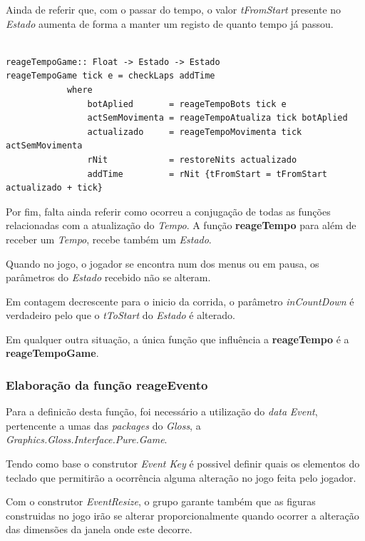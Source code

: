 \documentclass[a4paper]{report} %
\begin{document}
Ainda de referir que, com o passar do tempo, o valor \emph{tFromStart} presente no \emph{Estado} aumenta de forma a manter um registo de quanto tempo já passou.

\begin{verbatim}

reageTempoGame:: Float -> Estado -> Estado
reageTempoGame tick e = checkLaps addTime
            where
                botAplied       = reageTempoBots tick e
                actSemMovimenta = reageTempoAtualiza tick botAplied
                actualizado     = reageTempoMovimenta tick actSemMovimenta
                rNit            = restoreNits actualizado
                addTime         = rNit {tFromStart = tFromStart actualizado + tick}               

\end{verbatim}

Por fim, falta ainda referir como ocorreu a conjugação de todas as funções relacionadas com a atualização do \emph{Tempo}. A função \textbf{reageTempo} para além de receber um \emph{Tempo}, recebe também um \emph{Estado}.

Quando no jogo, o jogador se encontra num dos menus ou em pausa, os parâmetros do \emph{Estado} recebido não se alteram.

Em contagem decrescente para o inicio da corrida, o parâmetro \emph{inCountDown} é verdadeiro pelo que o \emph{tToStart} do \emph{Estado}
é alterado.

Em qualquer outra situação, a única função que influência a \textbf{reageTempo} é a \textbf{reageTempoGame}.

\normalsize

\subsubsection{Elaboração da função \textbf{reageEvento}}

Para a definicão desta função, foi necessário a utilização do \textit{data} \textit{Event}, pertencente a umas das \textit{packages} do \textit{Gloss}, a \textit{Graphics.Gloss.Interface.Pure.Game}. 

Tendo como base o construtor \textit{Event Key} é possivel definir quais os elementos do teclado que permitirão a ocorrência alguma alteração no jogo feita pelo jogador.

Com o construtor \textit{EventResize}, o grupo garante também que as figuras construidas no jogo irão se alterar proporcionalmente quando ocorrer a alteração das dimensões da janela onde este decorre.
\end{document}
